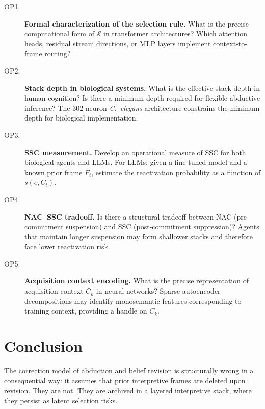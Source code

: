 \documentclass[12pt]{article}
\begin{document}
\begin{description}

\item[OP1.] \textbf{Formal characterization of the selection rule.}
  What is the precise computational form of $\mathcal{S}$ in
  transformer architectures?
  Which attention heads, residual stream directions, or MLP layers
  implement context-to-frame routing?

\item[OP2.] \textbf{Stack depth in biological systems.}
  What is the effective stack depth in human cognition?
  Is there a minimum depth required for flexible abductive inference?
  The 302-neuron \textit{C.~elegans} architecture constrains
  the minimum depth for biological implementation.

\item[OP3.] \textbf{SSC measurement.}
  Develop an operational measure of SSC for both biological
  agents and LLMs.
  For LLMs: given a fine-tuned model and a known prior frame $F_t$,
  estimate the reactivation probability as a function of
  $s(e, C_t)$.

\item[OP4.] \textbf{NAC--SSC tradeoff.}
  Is there a structural tradeoff between NAC (pre-commitment
  suspension) and SSC (post-commitment suppression)?
  Agents that maintain longer suspension may form shallower stacks
  and therefore face lower reactivation risk.

\item[OP5.] \textbf{Acquisition context encoding.}
  What is the precise representation of acquisition context $C_k$
  in neural networks?
  Sparse autoencoder decompositions \cite{bricken2023monosemanticity}
  may identify monosemantic features corresponding to training
  context, providing a handle on $C_k$.

\end{description}

\section{Conclusion}

The correction model of abduction and belief revision is structurally
wrong in a consequential way: it assumes that prior interpretive
frames are deleted upon revision.
They are not.
They are archived in a layered interpretive stack,
where they persist as latent selection risks.
\end{document}
